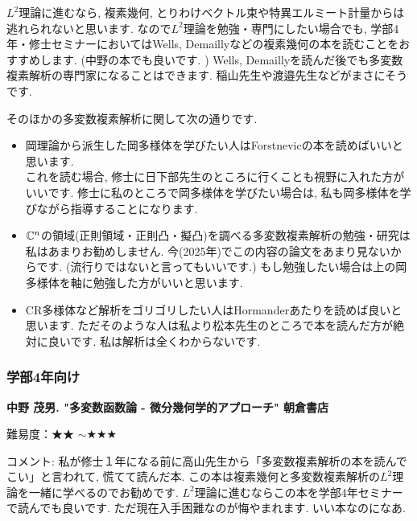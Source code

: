 $L^2$理論に進むなら, 複素幾何, とりわけベクトル束や特異エルミート計量からは逃れられないと思います. 
なので$L^2$理論を勉強・専門にしたい場合でも, 学部4年・修士セミナーにおいてはWells, Demaillyなどの複素幾何の本を読むことをおすすめします. (中野の本でも良いです. )
Wells, Demaillyを読んだ後でも多変数複素解析の専門家になることはできます. 稲山先生や渡邉先生などがまさにそうです. 

そのほかの多変数複素解析に関して次の通りです. 
\vspace{-8pt}
\begin{tcolorbox}[mybox]
\begin{itemize}[left=0pt]
  \setlength{\parskip}{0cm} %
  \setlength{\itemsep}{5pt} %
\item 岡理論から派生した岡多様体を学びたい人はForstnevicの本を読めばいいと思います.  \\ これを読む場合, 修士に日下部先生のところに行くことも視野に入れた方がいいです. 修士に私のところで岡多様体を学びたい場合は, 私も岡多様体を学びながら指導することになります. 
\item $\mathbb{C}^n$の領域(正則領域・正則凸・擬凸)を調べる多変数複素解析の勉強・研究は私はあまりお勧めしません. 今(2025年)でこの内容の論文をあまり見ないからです. (流行りではないと言ってもいいです.) もし勉強したい場合は上の岡多様体を軸に勉強した方がいいと思います. 
\item CR多様体など解析をゴリゴリしたい人はHormanderあたりを読めば良いと思います. ただそのような人は私より松本先生のところで本を読んだ方が絶対に良いです. 私は解析は全くわからないです. 
\end{itemize}
\end{tcolorbox}


\subsubsection{学部4年向け}

\textbf{中野 茂男. "多変数函数論 - 微分幾何学的アプローチ" 朝倉書店}  　\vspace{-6pt} 

難易度：★★ $\sim$★★★ 　\vspace{-6pt} 

コメント: 私が修士１年になる前に高山先生から「多変数複素解析の本を読んでこい」と言われて, 慌てて読んだ本. この本は複素幾何と多変数複素解析の$L^2$理論を一緒に学べるのでお勧めです. $L^2$理論に進むならこの本を学部4年セミナーで読んでも良いです. ただ現在入手困難なのが悔やまれます. いい本なのになあ. 

